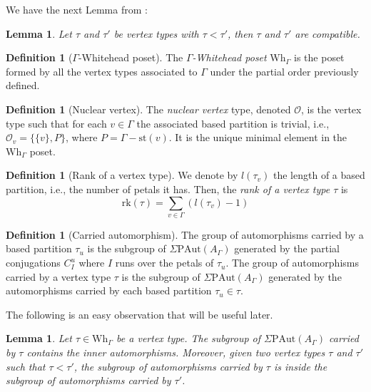 \documentclass[a4paper]{amsart}
\newcommand{\G}{\Gamma}
\newcommand{\A}{{A_\Gamma}}
\newcommand{\PAut}{\Sigma\mathrm{PAut}}
\newcommand{\Wh}{\mathrm{Wh}}
\newcommand{\st}{\mathrm{st}}
\newcommand{\OO}{ \mathcal{O}}
\newtheorem{lem}[teo]{Lemma}
\theoremstyle{definition}
\newtheorem{defi}[teo]{Definition}
\theoremstyle{remark}
\begin{document}
We have the next Lemma from \cite[Lemma 4.5.]{ArMar}:

\begin{lem}\label{lem:ordercomp} Let $\tau$ and $\tau'$ be vertex types with $\tau<\tau'$, then $\tau$ and $\tau'$ are compatible.
\end{lem}



\begin{defi}[$\Gamma$-Whitehead poset]
    The {\sl $\Gamma$-Whitehead poset} Wh$_{\G}$ is the poset formed by all the vertex types associated to $\G$ under the partial order previously defined. 
\end{defi}

\begin{defi}[Nuclear vertex]
The {\sl nuclear vertex} type, denoted  $\OO$, is the vertex type such that  for each $v\in \G$ the associated based partition is trivial, i.e., $\OO_v=\{\{v\},P\}$, where $P=\G-\st(v)$. It is the unique minimal element in the $\Wh_{\G}$ poset.
\end{defi}

\begin{defi}[Rank of a vertex type]
   We denote by $l(\tau_v)$ the length of a based partition, i.e., the number of petals it has. Then, the {\sl rank of a vertex type $\tau$} is 
   $$\mathrm{rk}(\tau)=\displaystyle\sum_{v\in\G}(l(\tau_v)-1)$$
\end{defi}





\begin{defi}[Carried automorphism]\label{def:carried}
  The group of automorphisms carried  by a based partition $\tau_u$ is  the subgroup of $\PAut(\A)$ generated by the partial conjugations $C^u_I$ where $I$ runs over the petals of $\tau_u$. The group of automorphisms carried  by a vertex type $\tau$ is the subgroup of $\PAut(\A)$ generated by the automorphisms carried by each based partition $\tau_u\in\tau$.
\end{defi}

The following is an easy  observation that will be useful later.

\begin{lem}\label{lem:ordercarrier} Let $\tau\in\Wh_\G$ be a vertex type. The subgroup of $\PAut(\A)$   carried  by $\tau$ contains the inner automorphisms. Moreover, given two vertex types $\tau$ and $\tau'$ such that $\tau<\tau'$, the subgroup of automorphisms carried by $\tau$ is inside the subgroup of automorphisms carried by $\tau'$.
\end{lem}
\end{document}
